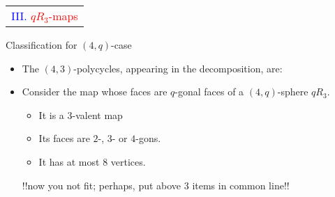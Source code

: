 \documentclass[%
pdf,
colorBG,
slideColor,
]{prosper}
\begin{document}
\begin{slide}{}
\begin{center}
{\Huge 
\begin{tabular*}{7cm}{c}
\\[-0.5cm]
\textcolor{blue}{III. }\textcolor{red}{$qR_3$-maps}
\end{tabular*}
}
\end{center}
\end{slide}






\begin{slide}{Classification for $(4,q)$-case}
\begin{itemize}
\item The $(4,3)$-polycycles, appearing in the decomposition, are:
\begin{center}
\end{center}
\begin{center}
\end{center}

\item Consider the map whose faces are $q$-gonal faces of a $(4,q)$-sphere $qR_3$.
\begin{itemize}
\item It is a $3$-valent map
\item Its faces are $2$-, $3$- or $4$-gons.
\item It has at most $8$ vertices.
\end{itemize}
!!now you not fit; perhaps, put above 3 items in common line!!
\end{itemize}
\end{slide}
\end{document}

